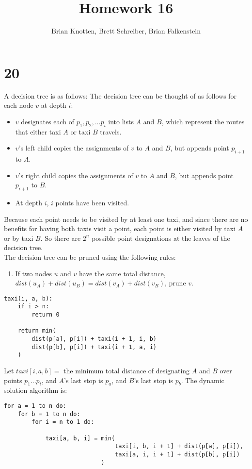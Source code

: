 \documentclass[letterpaper,notitlepage,twoside]{article}
\begin{document}
\title{Homework 16}
\author{Brian Knotten, Brett Schreiber, Brian Falkenstein}
\maketitle

\section*{20}
A decision tree is as follows:
The decision tree can be thought of as follows for each node $v$ at depth $i$:
\begin{itemize}
  \item $v$ designates each of $p_1,p_2,...p_i$ into lists $A$ and $B$, which represent the routes that either taxi $A$ or taxi $B$ travels.
  \item $v$'s left child copies the assignments of $v$ to $A$ and $B$, but appends point $p_{i + 1}$ to $A$.
  \item $v$'s right child copies the assignments of $v$ to $A$ and $B$, but appends point $p_{i + 1}$ to $B$.
  \item At depth $i$, $i$ points have been visited.
\end{itemize}
Because each point needs to be visited by at least one taxi, and since there are no benefits for having both taxis visit a point, each point is either visited by taxi $A$ or by taxi $B$. So there are $2^n$ possible point designations at the leaves of the decision tree. \\
The decision tree can be pruned using the following rules:
\begin{enumerate}
  \item If two nodes $u$ and $v$ have the same total distance, $dist(u_A) + dist(u_B) = dist(v_A) + dist(v_B)$, prune $v$.
  
\end{enumerate}

\begin{verbatim}
taxi(i, a, b):
    if i > n:
        return 0
    
    return min(
        dist(p[a], p[i]) + taxi(i + 1, i, b)
        dist(p[b], p[i]) + taxi(i + 1, a, i)
    )
\end{verbatim}

Let $taxi[i, a, b] =$ the minimum total distance of designating $A$ and $B$ over points $p_1...p_i$, and $A$'s last stop is $p_a$, and $B$'s last stop is $p_b$. The dynamic solution algorithm is:

\begin{verbatim}
for a = 1 to n do:
    for b = 1 to n do:
        for i = n to 1 do:
        
            taxi[a, b, i] = min(
                                taxi[i, b, i + 1] + dist(p[a], p[i]),
					            taxi[a, i, i + 1] + dist(p[b], p[i])
				            )
\end{verbatim}
\end{document}
